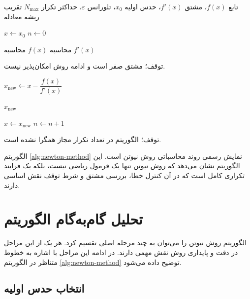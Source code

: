 \begin{algorithm}
\caption{روش نیوتن برای حل معادله $f(x)=0$}
\label{alg:newton-method}
\begin{algorithmic}[1]

\Require تابع $f(x)$، مشتق $f'(x)$، حدس اولیه $x_0$، تلورانس $\varepsilon$، حداکثر تکرار $N_{\max}$
\Ensure تقریب ریشه معادله

\State $x \leftarrow x_0$
\State $n \leftarrow 0$
\label{line:init}

 \label{line:while-start}

    \State محاسبه $f(x)$ \label{line:calc-f}
    \State محاسبه $f'(x)$ \label{line:calc-df}

     \label{line:check-derivative}
        \State توقف؛ مشتق صفر است و ادامه روش امکان‌پذیر نیست. \label{line:stop-derivative}
    \EndIf

    \State $x_{\mathrm{new}} \leftarrow x - \dfrac{f(x)}{f'(x)}$ \label{line:newton-update}

     \label{line:check-convergence}
        \State \Return $x_{\mathrm{new}}$ \label{line:return-root}
    \EndIf

    \State $x \leftarrow x_{\mathrm{new}}$ \label{line:update-x}
    \State $n \leftarrow n + 1$ \label{line:increment-n}

\EndWhile

\State توقف؛ الگوریتم در تعداد تکرار مجاز همگرا نشده است. \label{line:not-converged}

\end{algorithmic}
\end{algorithm}

الگوریتم \ref{alg:newton-method} نمایش رسمی روند محاسباتی روش نیوتن است. این الگوریتم نشان می‌دهد که روش نیوتن تنها یک فرمول ریاضی نیست، بلکه یک فرایند تکراری کامل است که در آن کنترل خطا، بررسی مشتق و شرط توقف نقش اساسی دارند.

\section{تحلیل گام‌به‌گام الگوریتم}

الگوریتم روش نیوتن را می‌توان به چند مرحله اصلی تقسیم کرد. هر یک از این مراحل در دقت و پایداری روش نقش مهمی دارند. در ادامه این مراحل با اشاره به خطوط متناظر در الگوریتم \ref{alg:newton-method} توضیح داده می‌شود.

\subsection{انتخاب حدس اولیه}

